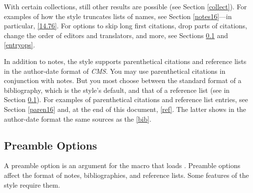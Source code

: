 \documentclass[11pt,letterpaper,oneside]{article}
\begin{document}
With certain collections, still other results are possible (see
Section \ref{collect}). For examples of how the style truncates lists
of names, see Section \ref{notes16}---in particular, \ref{14.76}. For
options to skip long first citations, drop parts of citations, change
the order of editors and translators, and more, see Sections
\ref{preops} and \ref{entryops}.

In addition to notes, the style supports parenthetical citations and
reference lists in the author-date format of \textit{CMS}. You may use
parenthetical citations in conjunction with notes. But you most choose
between the standard format of a bibliography, which is the style's
default, and that of a reference list (see  in Section
\ref{preops}). For examples of parenthetical citations and reference
list entries, see Section \ref{paren16} and, at the end of this
document, \ref{ref}. The latter shows in the author-date format the
same sources as the \ref{bib}.

\subsection{Preamble Options}
\label{preops}

A preamble option is an argument for the  macro that
loads \biblatex. Preamble options affect the format of notes,
bibliographies, and reference lists. Some features of the style
require them.
\end{document}
